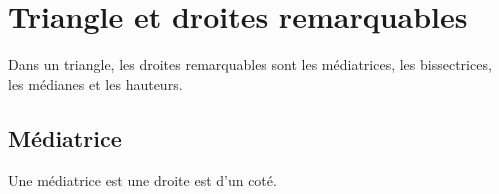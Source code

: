 \documentclass[12pt,a4paper]{article}
\date{}
\title{}
\begin{document}




\section{Triangle et droites remarquables}

Dans un triangle, les droites remarquables sont les médiatrices, les bissectrices, les médianes et les hauteurs.

\subsection{Médiatrice}

\begin{mydef}	
	Une médiatrice est une droite est  d'un coté.	
\end{mydef}
\end{document}
